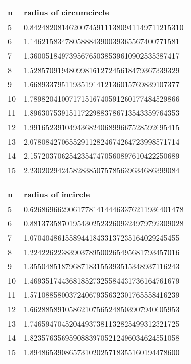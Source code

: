 \documentclass[]{article}
\numberwithin{equation}{section}
\begin{document}
	\begin{table}[]
		\begin{tabular}{|l|l|}
			\hline
			n  & radius of circumcircle                    \\ \hline
			5  & 0.842482081462007459111380941149711215310 \\ \hline
			6  & 1.14621583478058884390039365567400771581  \\ \hline
			7  & 1.36005184973956765038539610902535387417  \\ \hline
			8  & 1.52857091948099816127245618479367339329  \\ \hline
			9  & 1.66893379511935191412136015769839107377  \\ \hline
			10 & 1.78982041007171516740591260177484529866  \\ \hline
			11 & 1.89630753915117229883786713543359764353  \\ \hline
			12 & 1.99165239104943682406899667528592695415  \\ \hline
			13 & 2.07808427065529112824674264723998571714  \\ \hline
			14 & 2.15720370625423547470560897610422250689  \\ \hline
			15 & 2.23020294245828385075785639634686399084  \\ \hline
		\end{tabular}
	\end{table}
	
	\begin{table}[]
		\begin{tabular}{|l|l|}
			\hline
			n  & radius of incircle                        \\ \hline
			5  & 0.626869662906177814144463376211936401478 \\ \hline
			6  & 0.881373587019543025232609324979792309028 \\ \hline
			7  & 1.07040486155894418433137235164029245455  \\ \hline
			8  & 1.22422622383903789500265495681793457016  \\ \hline
			9  & 1.35504851879687183155393515348937116243  \\ \hline
			10 & 1.46935174436818527325584431736164761679  \\ \hline
			11 & 1.57108858003724067935632301765558416239  \\ \hline
			12 & 1.66288589105862107565248503907940605953  \\ \hline
			13 & 1.74659470452044937381132825499312321725  \\ \hline
			14 & 1.82357635695908839705212496034624551058  \\ \hline
			15 & 1.89486539086573102025718355160194478600  \\ \hline
		\end{tabular}
	\end{table}
	
\end{document}
